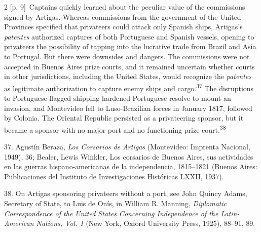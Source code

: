 \documentclass[10pt,a4paper]{article}
\begin{document}
\begin{paracol}{2}
{\scriptsize\color{gray} [p. 9]}\ Captains quickly learned about the peculiar value of the commissions signed by Artigas. Whereas commissions from the government of the United Provinces specified that privateers could attack only Spanish ships, Artigas’s \textit{patentes} authorized captures of both Portuguese and Spanish vessels, opening to privateers the possibility of tapping into the lucrative trade from Brazil and Asia to Portugal. But there were downsides and dangers. The commissions were not accepted in Buenos Aires prize courts, and it remained uncertain whether courts in other jurisdictions, including the United States, would recognize the \textit{patentes} as legitimate authorization to capture enemy ships and cargo.\nobreak\textsuperscript{37} The disruptions to Portuguese-flagged shipping hardened Portuguese resolve to mount an invasion, and Montevideo fell to Luso-Brazilian forces in January 1817, followed by Colonia. The Oriental Republic persisted as a privateering sponsor, but it became a sponsor with no major port and no functioning prize court.\nobreak\textsuperscript{38}\par{\small 37. Agustín Beraza, \textit{Los Corsarios de Artigas} (Montevideo: Imprenta Nacional, 1949), 36; Bealer, Lewis Winkler, Los corsarios de Buenos Aires, sus actividades en las guerras hispano-americanas de la independencia, 1815–1821 (Buenos Aires: Publicaciones del Instituto de Investigaciones Históricas LXXII, 1937).\par}{\small 38. On Artigas sponsoring privateers without a port, see John Quincy Adams, Secretary of State, to Luis de Onís, in William R. Manning, \textit{Diplomatic Correspondence of the United States Concerning Independence of the Latin-American Nations, Vol. 1} (New York, Oxford University Press, 1925), 88–91, 89.\par}
\switchcolumn*

\end{paracol}
\end{document}
